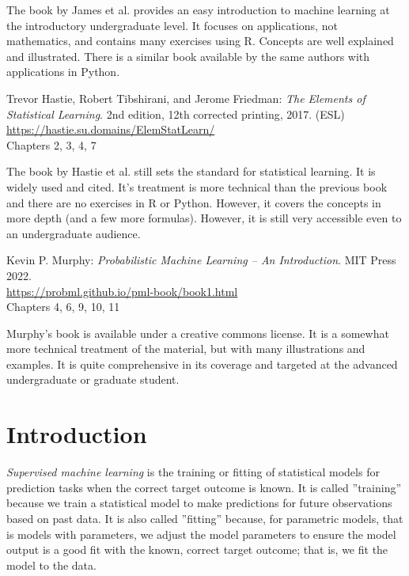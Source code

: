 The book by James et al. provides an easy introduction to machine learning at the introductory undergraduate level. It focuses on applications, not mathematics, and contains many exercises using R. Concepts are well explained and illustrated. There is a similar book available by the same authors with applications in Python. 

\begin{tcolorbox}[colback=alert]
Trevor Hastie, Robert Tibshirani, and Jerome Friedman: \emph{The Elements of Statistical Learning}. 2nd edition, 12th corrected printing, 2017. (ESL) \\

\url{https://hastie.su.domains/ElemStatLearn/} \\

Chapters 2, 3, 4, 7
\end{tcolorbox}

The book by Hastie et al. still sets the standard for statistical learning. It is widely used and cited. It's treatment is more technical than the previous book and there are no exercises in R or Python. However, it covers the concepts in more depth (and a few more formulas). However, it is still very accessible even to an undergraduate audience.

\begin{tcolorbox}[colback=alert]
Kevin P. Murphy: \emph{Probabilistic Machine Learning -- An Introduction}. MIT Press 2022. \\

\url{https://probml.github.io/pml-book/book1.html} \\

Chapters 4, 6, 9, 10, 11
\end{tcolorbox}

Murphy's book is available under a creative commons license. It is a somewhat more technical treatment of the material, but with many illustrations and examples. It is quite comprehensive in its coverage and targeted at the advanced undergraduate or graduate student. 

\section{Introduction}

\emph{Supervised machine learning} is the training or fitting of statistical models for prediction tasks when the correct target outcome is known. It is called ''training'' because we train a statistical model to make predictions for future observations based on past data. It is also called ''fitting'' because, for parametric models, that is models with parameters, we adjust the model parameters to ensure the model output is a good fit with the known, correct target outcome; that is, we fit the model to the data. 


